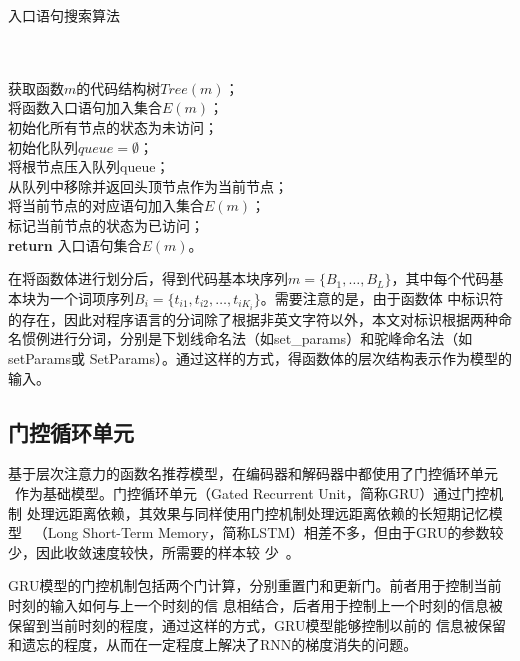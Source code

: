 \begin{algorithm}[H]
\caption{入口语句搜索算法}\label{alg:block}
\\
\\
获取函数$m$的代码结构树$Tree(m)$；\\
将函数入口语句加入集合$E(m)$；\\
初始化所有节点的状态为未访问；\\
初始化队列$queue=\emptyset$；\\
将根节点压入队列queue；\\
 {
    从队列中移除并返回头顶节点作为当前节点；\\
     {
         {
            将当前节点的对应语句加入集合$E(m)$；\\
        }
    }
    标记当前节点的状态为已访问；\\
}
\textbf{return} 入口语句集合$E(m)$。\\
\end{algorithm}

在将函数体进行划分后，得到代码基本块序列$m=\{B_1, \dots, B_L\}$，其中每个代码基
本块为一个词项序列$B_i=\{t_{i1},t_{i2},\dots,t_{iK_i}\}$。需要注意的是，由于函数体
中标识符的存在，因此对程序语言的分词除了根据非英文字符以外，本文对标识根据两种命
名惯例进行分词，分别是下划线命名法（如set\_params）和驼峰命名法（如setParams或
SetParams）。通过这样的方式，得函数体的层次结构表示作为模型的输入。


\subsection{门控循环单元}
基于层次注意力的函数名推荐模型，在编码器和解码器中都使用了门控循环单元
~\cite{Kyunghyun2014Learning}作为基础模型。门控循环单元（Gated Recurrent Unit，简称GRU）通过门控机制
处理远距离依赖，其效果与同样使用门控机制处理远距离依赖的长短期记忆模型~\cite{Hochreiter1997Long}
（Long Short-Term Memory，简称LSTM）相差不多，但由于GRU的参数较少，因此收敛速度较快，所需要的样本较
少~\cite{Chung2014Empirical}。

GRU模型的门控机制包括两个门计算，分别重置门和更新门。前者用于控制当前时刻的输入如何与上一个时刻的信
息相结合，后者用于控制上一个时刻的信息被保留到当前时刻的程度，通过这样的方式，GRU模型能够控制以前的
信息被保留和遗忘的程度，从而在一定程度上解决了RNN的梯度消失的问题。

